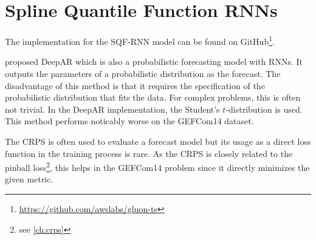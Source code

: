 \section{Spline Quantile Function RNNs}
\label{sec:implementation-sqf-rnn}

The implementation for the SQF-RNN model can be found on GitHub\footnote{\url{https://github.com/awslabs/gluon-ts}}.

\Textcite{Salinas2017} proposed DeepAR which is also a 
probabilistic forecasting model with RNNs. It outputs the 
parameters of a probabilistic distribution as the forecast. 
The disadvantage of this method is that it requires the 
specification of the probabilistic distribution that fits the data. 
For complex problems, this is often not trivial. 
In the DeepAR implementation, the Student's \(t\)-distribution is used. 
This method performs noticably worse on the GEFCom14 dataset. 

The CRPS is often used to evaluate a forecast model but its usage as 
a direct loss function in the training process is rare. 
As the CRPS is closely related to the pinball loss\footnote{see \ref{ch:crps}}, 
this helps in the GEFCom14 problem since it directly minimizes the given metric.